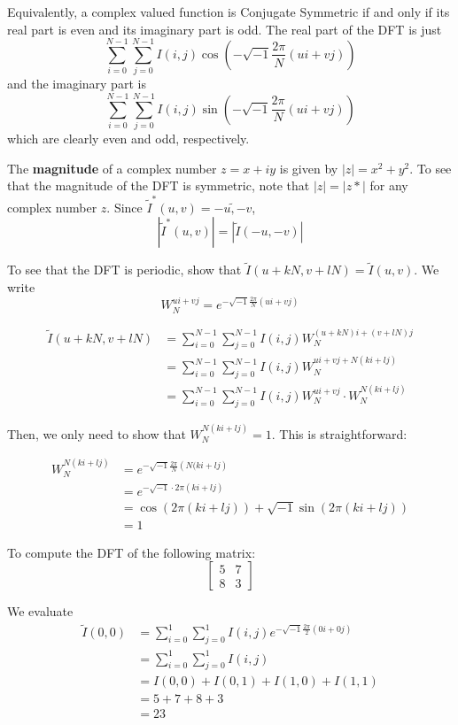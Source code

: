 \documentclass[a4paper]{article}
\begin{document}
Equivalently, a complex valued function is Conjugate Symmetric if and only if its real part is even and its imaginary part is odd. The real part of the DFT is just \[\sum_{i=0}^{N-1}\sum_{j=0}^{N-1}I(i, j)\cos{\left(-\sqrt{-1}\frac{2\pi}{N}\left(ui+vj\right)\right)}\] and the imaginary part is \[\sum_{i=0}^{N-1}\sum_{j=0}^{N-1}I(i, j)\sin{\left(-\sqrt{-1}\frac{2\pi}{N}\left(ui+vj\right)\right)}\] which are clearly even and odd, respectively.

The \textbf{magnitude} of a complex number $z=x+iy$ is given by $|z|=x^2+y^2$. To see that the magnitude of the DFT is symmetric, note that $|z|=|z*|$ for any complex number $z$. Since $\tilde{I}^*(u, v)=\tilde{-u, -v}$, \[\left|\tilde{I}^*(u, v)\right|=\left|\tilde{I}(-u, -v)\right|\]

To see that the DFT is periodic, show that $\tilde{I}(u+kN,v+lN)=\tilde{I}(u,v)$. We write \[W_N^{ui+vj}=e^{-\sqrt{-1}\frac{2\pi}{N}\left(ui+vj\right)}\]

\begin{align*}
 \tilde{I}(u+kN, v+lN)&=\sum_{i=0}^{N-1}\sum_{j=0}^{N-1}I(i, j)W_N^{(u+kN)i+(v+lN)j}
		\\&=\sum_{i=0}^{N-1}\sum_{j=0}^{N-1}I(i, j)W_N^{ui+vj+N(ki+lj)}
		\\&=\sum_{i=0}^{N-1}\sum_{j=0}^{N-1}I(i, j)W_N^{ui+vj}\cdot W_N^{N(ki+lj)}
\end{align*}

Then, we only need to show that $W_N^{N(ki+lj)}=1$. This is straightforward:

\begin{align*}
W_N^{N(ki+lj)}&=e^{-\sqrt{-1}\frac{2\pi}{N}\left(N(ki+lj\right)}
	    \\&=e^{-\sqrt{-1}\cdot2\pi\left(ki+lj\right)}
	    \\&=\cos\left(2\pi(ki+lj)\right)+\sqrt{-1}\sin\left(2\pi(ki+lj)\right)
	    \\&=1
\end{align*}

To compute the DFT of the following matrix: \[\begin{bmatrix}5&7\\8&3\end{bmatrix}\]

We evaluate \begin{align*}
	     \tilde{I}(0,0)&=\sum_{i=0}^1\sum_{j=0}^{1}I(i, j)e^{-\sqrt{-1}\frac{2\pi}{2}\left(0i + 0j\right)}
			 \\&=\sum_{i=0}^1\sum_{j=0}^{1}I(i,j)
			 \\&=I(0,0)+I(0,1)+I(1, 0)+I(1,1)
			 \\&=5+7+8+3
			 \\&=23
	    \end{align*}
	    
\end{document}
